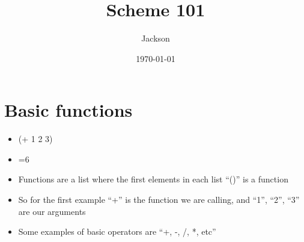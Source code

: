 \documentclass[11pt]{article}
\author{Jackson}
\date{\today}
\title{Scheme 101}
\begin{document}
\maketitle
\tableofcontents


\section{Basic functions}
\label{sec:orge00c60c}
\begin{itemize}
\item (+ 1 2 3)
\item =6
\item Functions are a list where the first elements in each list ``()'' is a function
\item So for the first example ``+'' is the function we are calling, and ``1'', ``2'', ``3'' are our arguments
\item Some examples of basic operators are ``+, -, /, *, etc''
\end{itemize}
\end{document}
